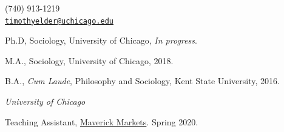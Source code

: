 \documentclass[11pt,article,oneside]{memoir}
\makeatletter
\def\myemail{timothyelder@uchicago.edu}
\def\myphone{(740) 913-1219}
\makeatother
\begin{document}
\begin{minipage}[t]{2.95in}

\end{minipage}
\hfill
\hfill
\begin{minipage}[t]{1.3in}
  \flushright \footnotesize  \addressblock \myphone \, \faPhone \\
  {\scriptsize  \texttt{\href{mailto:\myemail}{\myemail}} \, \faEnvelope} \\
\end{minipage}

\medskip

\reversemarginpar

\bigskip





\ind Ph.D, Sociology, University of Chicago, \emph{In progress}.


\ind M.A., Sociology, University of Chicago, 2018.

\ind B.A., \emph{Cum Laude}, Philosophy and Sociology, Kent State University, 2016.

\bigskip

\medskip
\noindent\emph{University of Chicago \vspace{0.01in}}

\ind Teaching Assistant, \underline{Maverick Markets}. Spring 2020.
\end{document}
